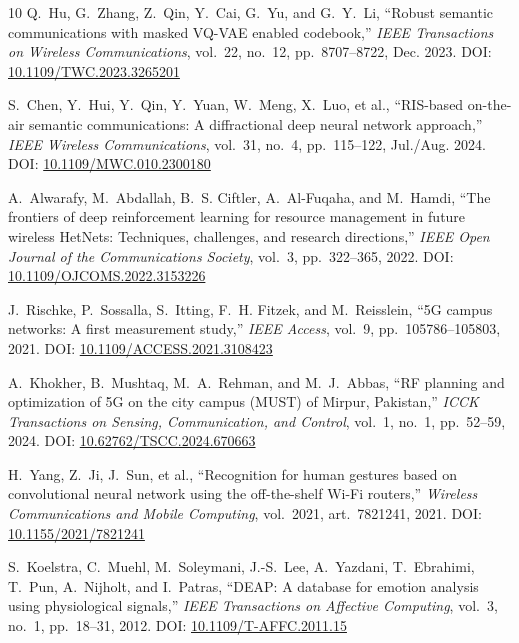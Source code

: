 \documentclass[journal]{IEEEtran}
\begin{document}
\begin{thebibliography}{10}
Q.~Hu, G.~Zhang, Z.~Qin, Y.~Cai, G.~Yu, and G.~Y.~Li, ``Robust semantic communications with masked VQ-VAE enabled codebook,'' \emph{IEEE Transactions on Wireless Communications}, vol.~22, no.~12, pp.~8707--8722, Dec. 2023. DOI: \href{https://doi.org/10.1109/TWC.2023.3265201}{10.1109/TWC.2023.3265201}

S.~Chen, Y.~Hui, Y.~Qin, Y.~Yuan, W.~Meng, X.~Luo, et al., ``RIS-based on-the-air semantic communications: A diffractional deep neural network approach,'' \emph{IEEE Wireless Communications}, vol.~31, no.~4, pp.~115--122, Jul./Aug. 2024. DOI: \href{https://doi.org/10.1109/MWC.010.2300180}{10.1109/MWC.010.2300180}

A.~Alwarafy, M.~Abdallah, B.~S. Ciftler, A.~Al-Fuqaha, and M.~Hamdi, ``The frontiers of deep reinforcement learning for resource management in future wireless HetNets: Techniques, challenges, and research directions,'' \emph{IEEE Open Journal of the Communications Society}, vol.~3, pp.~322--365, 2022. DOI: \href{https://doi.org/10.1109/OJCOMS.2022.3153226}{10.1109/OJCOMS.2022.3153226}

J.~Rischke, P.~Sossalla, S.~Itting, F.~H. Fitzek, and M.~Reisslein, ``5G campus networks: A first measurement study,'' \emph{IEEE Access}, vol.~9, pp.~105786--105803, 2021. DOI: \href{https://doi.org/10.1109/ACCESS.2021.3108423}{10.1109/ACCESS.2021.3108423}

A.~Khokher, B.~Mushtaq, M.~A.~Rehman, and M.~J.~Abbas, ``RF planning and optimization of 5G on the city campus (MUST) of Mirpur, Pakistan,'' \emph{ICCK Transactions on Sensing, Communication, and Control}, vol.~1, no.~1, pp.~52--59, 2024. DOI: \href{https://doi.org/10.62762/TSCC.2024.670663}{10.62762/TSCC.2024.670663}

H.~Yang, Z.~Ji, J.~Sun, et al., ``Recognition for human gestures based on convolutional neural network using the off-the-shelf Wi-Fi routers,'' \emph{Wireless Communications and Mobile Computing}, vol.~2021, art.~7821241, 2021. DOI: \href{https://doi.org/10.1155/2021/7821241}{10.1155/2021/7821241}

S.~Koelstra, C.~Muehl, M.~Soleymani, J.-S.~Lee, A.~Yazdani, T.~Ebrahimi, T.~Pun, A.~Nijholt, and I.~Patras, ``DEAP: A database for emotion analysis using physiological signals,'' \emph{IEEE Transactions on Affective Computing}, vol.~3, no.~1, pp.~18--31, 2012. DOI: \href{https://doi.org/10.1109/T-AFFC.2011.15}{10.1109/T-AFFC.2011.15}


\end{thebibliography}
\end{document}
